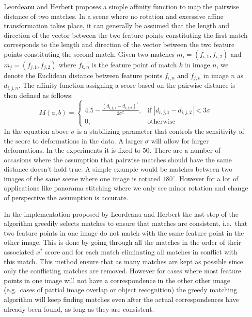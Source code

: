 Leordeanu and Herbert proposes a simple affinity function to map the 
pairwise distance of two matches. In a scene where no rotation and 
excessive affine transformation takes place, it can generally be assumed 
that the length and direction of the vector between
the two feature points constituting the first match corresponds to the 
length and direction of the vector between the two feature points 
constituting the second match. Given two matches $m_i = (f_{i,1}, 
f_{i,2})$ and $m_j = (f_{j,1},f_{j,2})$ where $f_{k,n}$ is the feature 
point of match $k$ in image $n$, we denote the Euclidean distance 
between feature points $f_{i,n}$ and $f_{j,n}$ in image $n$ as 
$d_{i,j,n}$.  The affinity function assigning a score based on the 
pairwise distance is then defined as follows:
\begin{equation*}
    M(a,b) = \begin{cases} 4.5 - \frac{\left(d_{i,j,1} - 
        d_{i,j,2}\right)^2}{2\sigma^2}, & \mbox{if } \left\vert 
                d_{i,j,1} - d_{i,j,2} \right\vert < 3\sigma \\ 0, & 
                \mbox{otherwise}
	\end{cases}
\end{equation*}
In the equation above $\sigma$ is a stabilizing parameter that controls 
the sensitivity of the score to deformations in the data. A larger 
$\sigma$ will allow for larger deformations. In the experiments it is 
fixed to 50. There are a number of occasions where the assumption that 
pairwise matches should have the same distance doesn't hold true.  A 
simple example would be matches between two images of the same scene 
where one image is rotated $180^{\circ}$.  However for a lot of 
applications like panorama stitching where we only see minor rotation 
and change of perspective the assumption is accurate.

In the implementation proposed by Leordeanu and Herbert 
\cite{leordeanu2005spectral} the last step of the algorithm greedily 
selects matches to ensure that matches are consistent, i.e.\ that two 
feature points in one image do not match with the same feature point in 
the other image. This is done by going through all the matches in the 
order of their associated $x^{*}$ score and for each match eliminating 
all matches in conflict with this match. This method ensure that as many
matches are kept as possible since only the conflicting matches are 
removed. However for cases where most feature points in one image will 
not have a correspondence in the other other image (e.g.\ cases of 
partial image overlap or object recognition) the greedy matching 
algorithm will keep finding matches even after the actual 
correspondences have already been found, as long as they are consistent.

